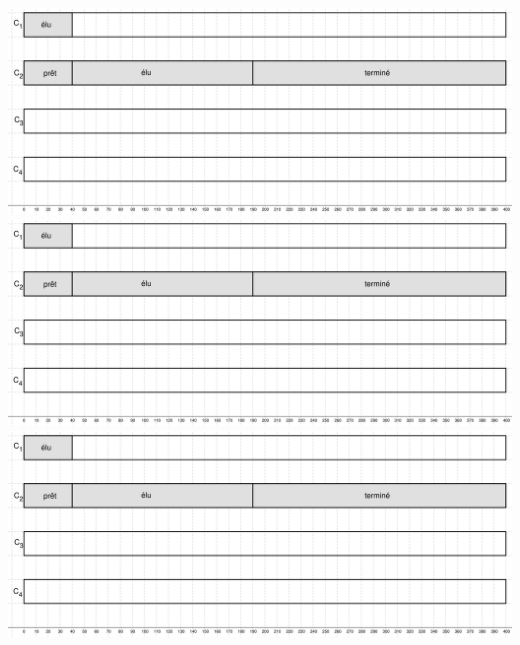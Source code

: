 \documentclass[a4paper,11pt]{article}
\begin{document}
\includegraphics[width=\linewidth]{../images/ps_file}
\vfill
\includegraphics[width=\linewidth]{../images/ps_file}
\vfill
\includegraphics[width=\linewidth]{../images/ps_file}
\end{document}
